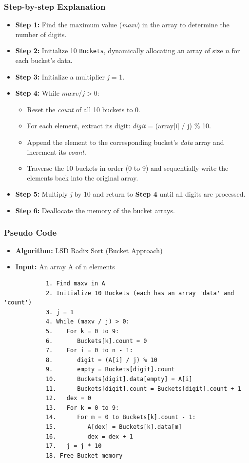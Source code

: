     \subsubsection{Step-by-step Explanation}
        \begin{itemize}
            \item \textbf{Step 1:} Find the maximum value (\textit{maxv}) in the array to determine the number of digits.
            \item \textbf{Step 2:} Initialize 10 \texttt{Buckets}, dynamically allocating an array of size $n$ for each bucket's data.
            \item \textbf{Step 3:} Initialize a multiplier \textit{j} = 1.
            \item \textbf{Step 4:} While $maxv / j > 0$:
            \begin{itemize}
                \item Reset the \textit{count} of all 10 buckets to 0.
                \item For each element, extract its digit: \textit{digit} = (array[i] / j) \% 10.
                \item Append the element to the corresponding bucket's \textit{data} array and increment its \textit{count}.
                \item Traverse the 10 buckets in order (0 to 9) and sequentially write the elements back into the original array.
            \end{itemize}
            \item \textbf{Step 5:} Multiply \textit{j} by 10 and return to \textbf{Step 4} until all digits are processed.
            \item \textbf{Step 6:} Deallocate the memory of the bucket arrays.
        \end{itemize}

    \subsubsection{Pseudo Code}
        \begin{itemize}
            \item \textbf{Algorithm:} LSD Radix Sort (Bucket Approach)
            \item \textbf{Input:} An array A of n elements
        \end{itemize}
        \begin{verbatim}
            1. Find maxv in A
            2. Initialize 10 Buckets (each has an array 'data' and 'count')
            3. j = 1
            4. While (maxv / j) > 0:
            5.    For k = 0 to 9:
            6.       Buckets[k].count = 0
            7.    For i = 0 to n - 1:
            8.       digit = (A[i] / j) % 10
            9.       empty = Buckets[digit].count
            10.      Buckets[digit].data[empty] = A[i]
            11.      Buckets[digit].count = Buckets[digit].count + 1
            12.   dex = 0
            13.   For k = 0 to 9:
            14.      For m = 0 to Buckets[k].count - 1:
            15.         A[dex] = Buckets[k].data[m]
            16.         dex = dex + 1
            17.   j = j * 10
            18. Free Bucket memory
        \end{verbatim}
